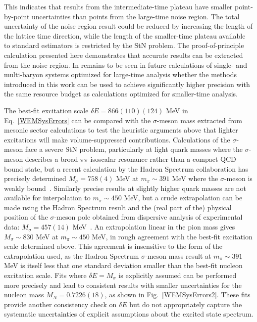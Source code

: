   This indicates that results from the intermediate-time plateau have smaller point-by-point uncertainties than points from the large-time noise region.
  The total uncertainty of the noise region result could be reduced by increasing the length of the lattice time direction, while the length of the smaller-time plateau available to standard estimators is restricted by the StN problem.
  The proof-of-principle calculation presented here demonstrates that accurate results can be extracted from the noise region.
  In remains to be seen in future calculations of single- and multi-baryon systems optimized for large-time analysis whether the methods introduced in this work can be used to achieve significantly higher precision with the same resource budget as calculations optimized for smaller-time analysis.

  The best-fit excitation scale $\delta E = 866(110)(124)$ MeV in Eq.~\ref{WEMSysErrors} can be compared with the $\sigma$-meson mass extracted from mesonic sector calculations to test the heuristic arguments above that lighter excitations will make volume-suppressed contributions.
  Calculations of the $\sigma$-meson face a severe StN problem, 
  particularly at light quark masses where the $\sigma$-meson describes a broad $\pi\pi$ isoscalar resonance rather than a compact QCD bound state,
  but a recent calculation by the Hadron Spectrum collaboration has precisely determined $M_\sigma = 758(4)$ MeV at $m_\pi \sim 391$ MeV where the $\sigma$-meson is weakly bound~\cite{Briceno:2016mjc}.
  Similarly precise results at slightly higher quark masses are not available for interpolation to $m_\pi \sim 450$ MeV, but a crude extrapolation can be made using the Hadron Spectrum result and the (real part of the) physical position of the $\sigma$-meson pole obtained from dispersive analysis of experimental data: $M_\sigma = 457(14)$ MeV~\cite{Caprini:2005zr,GarciaMartin:2011jx}.
  An extrapolation linear in the pion mass gives $M_\sigma \sim 830$ MeV at $m_\pi \sim 450$ MeV, in rough agreement with the best-fit excitation scale determined above.
  This agreement is insensitive to the form of the extrapolation used, as the Hadron Spectrum $\sigma$-meson mass result at $m_\pi \sim 391$ MeV is itself less that one standard deviation smaller than the best-fit nucleon excitation scale.
  Fits where $\delta E = M_\sigma$ is explicitly assumed can be performed more precisely and lead to consistent results with smaller uncertainties for the nucleon mass $M_N = 0.7226(18)$, as shown in Fig.~\ref{WEMSysErrors2}.
  These fits provide another consistency check on $\delta E$ but do not appropriately capture the systematic uncertainties of explicit assumptions about the excited state spectrum.


